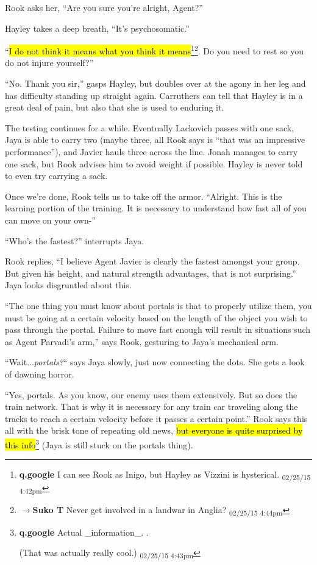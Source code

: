 Rook asks her, ``Are you sure you're alright, Agent?''

Hayley takes a deep breath, ``It's psychosomatic.''

``\hl{I do not think it means what you think it means}\footnote{\textbf{q.google }I can see Rook as Inigo, but Hayley as Vizzini is hysterical. \textsubscript{02/25/15 4:42pm}}\footnote{$\rightarrow$\textbf{Suko T }Never get involved in a landwar in Anglia? \textsubscript{02/25/15 4:44pm}}.  Do you need to rest so you do not injure yourself?''

``No.  Thank you sir,'' gasps Hayley, but doubles over at the agony in her leg and has difficulty standing up straight again.  Carruthers can tell that Hayley is in a great deal of pain, but also that she is used to enduring it.



The testing continues for a while.   Eventually Lackovich passes with one sack, Jaya is able to carry two (maybe three, all Rook says is ``that was an impressive performance''), and Javier hauls three across the line.  Jonah manages to carry one sack, but Rook advises him to avoid weight if possible.  Hayley is never told to even try carrying a sack.



Once we're done, Rook tells us to take off the armor. ``Alright.  This is the learning portion of the training.  It is necessary to understand how fast all of you can move on your own-''

``Who's the fastest?'' interrupts Jaya.

Rook replies, ``I believe Agent Javier is clearly the fastest amongst your group.  But given his height, and natural strength advantages, that is not surprising.''  Jaya looks disgruntled about this.



``The one thing you must know about portals is that to properly utilize them, you must be going at a certain velocity based on the length of the object you wish to pass through the portal.   Failure to move fast enough will result in situations such as Agent Parvadi's arm,'' says Rook, gesturing to Jaya's mechanical arm.

``Wait...\textit{portals?}`` says Jaya slowly, just now connecting the dots.  She gets a look of dawning horror.

``Yes, portals.  As you know, our enemy uses them extensively.  But so does the train network.  That is why it is necessary for any train car traveling along the tracks to reach a certain velocity before it passes a certain point.''  Rook says this all with the brisk tone of repeating old news, \hl{but everyone is quite surprised by this info}\footnote{\textbf{q.google }Actual \_information\_.  .

(That was actually really cool.) \textsubscript{02/25/15 4:43pm}} (Jaya is still stuck on the portals thing).

